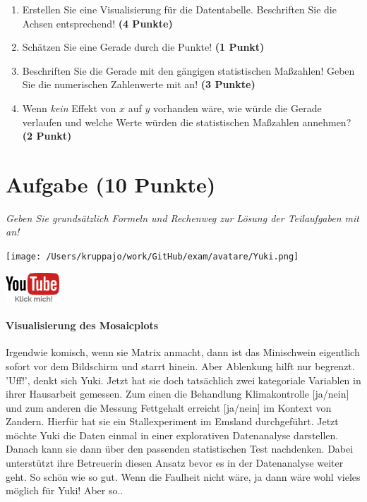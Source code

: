 \documentclass[a4paper, 9pt]{scrartcl}\usepackage[]{graphicx}\usepackage[]{xcolor}
\begin{document}
\begin{enumerate}
\item Erstellen Sie eine Visualisierung für die Datentabelle. Beschriften Sie
  die Achsen entsprechend! \textbf{(4 Punkte)}
\item Schätzen Sie eine Gerade durch die Punkte! \textbf{(1 Punkt)}
\item Beschriften Sie die Gerade mit den gängigen statistischen Maßzahlen! Geben Sie die numerischen Zahlenwerte mit an! \textbf{(3 Punkte)}
\item Wenn \textit{kein} Effekt von $x$ auf $y$ vorhanden wäre, wie würde die Gerade verlaufen und welche Werte würden die statistischen Maßzahlen annehmen? \textbf{(2 Punkt)}
\end{enumerate} 
\clearpage

\section{Aufgabe \hfill (10 Punkte)}

\textit{Geben Sie grundsätzlich Formeln und Rechenweg zur Lösung der Teilaufgaben mit an!} \\[1Ex]
 

 
\begin{minipage}[t]{0.5\textwidth}
\texttt{[image: /Users/kruppajo/work/GitHub/exam/avatare/Yuki.png]}
\end{minipage}
\begin{minipage}[t]{0.5\textwidth}
\hfill
\href{https://youtu.be/t_1KL77mfmg}{\includegraphics[width = 2cm]{img/youtube}}
\end{minipage}
\vspace{-3ex}



\paragraph{Visualisierung des Mosaicplots}

Irgendwie komisch, wenn sie Matrix anmacht, dann ist das Minischwein eigentlich sofort vor dem Bildschirm und starrt hinein. Aber Ablenkung hilft nur begrenzt. 'Uff!', denkt sich Yuki. Jetzt hat sie doch tatsächlich zwei kategoriale Variablen in ihrer Hausarbeit gemessen. Zum einen die Behandlung Klimakontrolle [ja/nein] und zum anderen die Messung Fettgehalt erreicht [ja/nein] im Kontext von Zandern. Hierfür hat sie ein Stallexperiment im Emsland durchgeführt. Jetzt möchte Yuki die Daten einmal in einer explorativen Datenanalyse darstellen. Danach kann sie dann über den passenden statistischen Test nachdenken. Dabei unterstützt ihre Betreuerin diesen Ansatz bevor es in der Datenanalyse weiter geht. So schön wie so gut. Wenn die Faulheit nicht wäre, ja dann wäre wohl vieles möglich für Yuki! Aber so..
\end{document}
